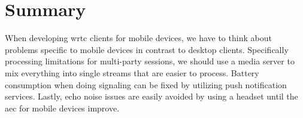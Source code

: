 \section{Summary}
When developing \gls{wrtc} clients for mobile devices, we have to think about problems specific to mobile devices in contrast to desktop clients. Specifically processing limitations for multi-party sessions, we should use a media server to mix everything into single streams that are easier to process. Battery consumption when doing signaling can be fixed by utilizing push notification services. Lastly, echo noise issues are easily avoided by using a headset until the \gls{aec} for mobile devices improve.